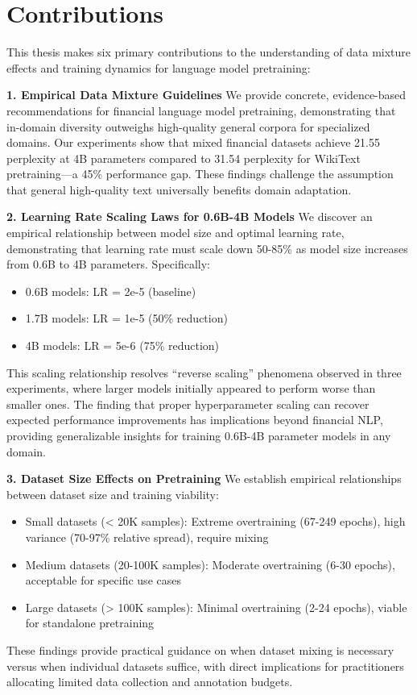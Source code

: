 \section{Contributions}

This thesis makes six primary contributions to the understanding of data mixture effects and training dynamics for language model pretraining:

\textbf{1. Empirical Data Mixture Guidelines}
We provide concrete, evidence-based recommendations for financial language model pretraining, demonstrating that in-domain diversity outweighs high-quality general corpora for specialized domains. Our experiments show that mixed financial datasets achieve 21.55 perplexity at 4B parameters compared to 31.54 perplexity for WikiText pretraining—a 45\% performance gap. These findings challenge the assumption that general high-quality text universally benefits domain adaptation.

\textbf{2. Learning Rate Scaling Laws for 0.6B-4B Models}
We discover an empirical relationship between model size and optimal learning rate, demonstrating that learning rate must scale down 50-85\% as model size increases from 0.6B to 4B parameters. Specifically:
\begin{itemize}
    \item 0.6B models: LR = 2e-5 (baseline)
    \item 1.7B models: LR = 1e-5 (50\% reduction)
    \item 4B models: LR = 5e-6 (75\% reduction)
\end{itemize}
This scaling relationship resolves ``reverse scaling'' phenomena observed in three experiments, where larger models initially appeared to perform worse than smaller ones. The finding that proper hyperparameter scaling can recover expected performance improvements has implications beyond financial NLP, providing generalizable insights for training 0.6B-4B parameter models in any domain.

\textbf{3. Dataset Size Effects on Pretraining}
We establish empirical relationships between dataset size and training viability:
\begin{itemize}
    \item Small datasets (< 20K samples): Extreme overtraining (67-249 epochs), high variance (70-97\% relative spread), require mixing
    \item Medium datasets (20-100K samples): Moderate overtraining (6-30 epochs), acceptable for specific use cases
    \item Large datasets (> 100K samples): Minimal overtraining (2-24 epochs), viable for standalone pretraining
\end{itemize}
These findings provide practical guidance on when dataset mixing is necessary versus when individual datasets suffice, with direct implications for practitioners allocating limited data collection and annotation budgets.

